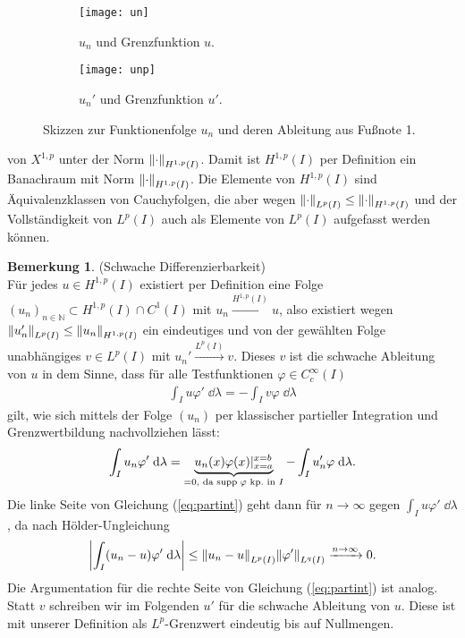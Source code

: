 \documentclass[twoside]{article}
\theoremstyle{definition}
\newtheorem{remark}[theorem]{Bemerkung}
\newcommand{\N}{\mathbb{N}}
\begin{document}
{\begin{figure}
\centering
	\begin{subfigure}[t]{0.49 \textwidth}
	\vskip 0pt
		\centering
		\texttt{[image: un]}
		\caption{$u_n$ und Grenzfunktion $u$.}
		\label{fig:un}		
	\end{subfigure}
	\begin{subfigure}[t]{0.49 \textwidth}
	\vskip 0pt
		\centering
		\texttt{[image: unp]}
		\caption{$u_n'$ und Grenzfunktion $u'$.}
		\label{fig:unp}
	\end{subfigure}
\caption{Skizzen zur Funktionenfolge $u_n$ und deren Ableitung aus Fußnote 1.}
\label{fig:ununp}
\end{figure}
} von $X^{1,p}$ unter der Norm $\norm{\cdot}_{H^{1,p}(I)}$. Damit ist $H^{1,p}(I)$ per Definition ein Banachraum mit Norm $\norm{\cdot}_{H^{1,p}(I)}$. Die Elemente von $H^{1,p}(I)$ sind Äquivalenzklassen von Cauchyfolgen, die aber wegen $\norm{\cdot}_{L^{p}(I)} \leq \norm{\cdot}_{H^{1,p}(I)}$ und der Vollständigkeit von $L^p(I)$ auch als Elemente von $L^p(I)$ aufgefasst werden können. 
\begin{remark} (Schwache Differenzierbarkeit) \label{rem:wdiff}\\
Für jedes $u \in H^{1,p}(I)$ existiert per Definition eine Folge $(u_n)_{n \in \N} \subset H^{1,p}(I) \cap C^1(I)$ mit $u_n \xrightarrow{H^{1,p}(I)} u$, also existiert wegen $\norm{u_n'}_{L^p(I)} \leq \norm{u_n}_{H^{1,p}(I)}$ ein eindeutiges und von der gewählten Folge unabhängiges $v \in L^p(I)$ mit $u_n' \xrightarrow{L^p(I)} v$. Dieses $v$ ist die schwache Ableitung von $u$ in dem Sinne, dass für alle Testfunktionen $\varphi \in C^\infty_c(I)$
\begin{align}
\int_I u \varphi' \; \dd \lambda = - \int_I v \varphi \; \dd \lambda \label{eq:schwach}
\end{align}
gilt, wie sich mittels der Folge $(u_n)$ per klassischer partieller Integration und Grenzwertbildung nachvollziehen lässt:
\begin{align}
\int_I u_n \varphi' \; \dd \lambda = \underbrace{u_n (x) \varphi(x) \vert_{x=a}^{x=b}}_{=0, \text{ da supp\;} \varphi \text{ kp.\ in } I} - \int_I u_n' \varphi \; \dd \lambda. \label{eq:partint}
\end{align}
Die linke Seite von Gleichung (\ref{eq:partint}) geht dann für $n \to \infty$ gegen $ \int_I u \varphi' \; \dd \lambda$, da nach Hölder-Ungleichung
\begin{align*}
\abs{\int_I (u_n - u) \varphi' \; \dd \lambda} \leq \norm{u_n - u}_{L^p(I)} \norm{\varphi'}_{L^q(I)}  \xrightarrow{n \to \infty} 0.
\end{align*}
Die Argumentation für die rechte Seite von Gleichung (\ref{eq:partint}) ist analog. Statt $v$ schreiben wir im Folgenden $u'$ für die schwache Ableitung von $u$. Diese ist mit unserer Definition als $L^p$-Grenzwert eindeutig bis auf Nullmengen.
\end{remark}
\end{document}
